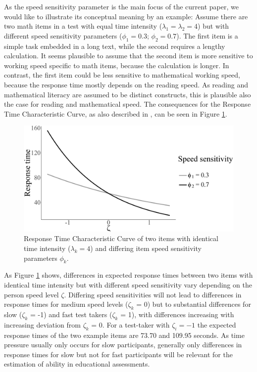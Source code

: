 \documentclass[a4paper,man,apacite,donotrepeattitle]{apa6}
\begin{document}
As the speed sensitivity parameter is the main focus of the current paper, we would like to illustrate its conceptual meaning by an example: Assume there are two math items in a test with equal time intensity ($\lambda_1 = \lambda_2 = 4$) but with different speed sensitivity parameters ($\phi_1 = 0.3$; $\phi_2 = 0.7$). The first item is a simple task embedded in a long text, while the second requires a lengthy calculation. It seems plausible to assume that the second item is more sensitive to working speed specific to math items, because the calculation is longer. In contrast, the first item could be less sensitive to mathematical working speed, because the response time mostly depends on the reading speed. As reading and mathematical literacy are assumed to be distinct constructs, this is plausible also the case for reading and mathematical speed. The consequences for the Response Time Characteristic Curve, as also described in , can be seen in Figure \ref{fig:phi_theoret}.

\begin{figure}
	\begin{center}
	 \includegraphics[height = 0.25\textheight]{phi_theoret.eps}
	\end{center}		
	 \caption{Response Time Characteristic Curve of two items with identical time intensity ($\lambda_{k} = 4$) and differing item speed sensitivity parameters $\phi_{k}$.}
	 \label{fig:phi_theoret}
\end{figure}

As Figure \ref{fig:phi_theoret} shows, differences in expected response times between two items with identical time intensity but with different speed sensitivity vary depending on the person speed level $\zeta$. Differing speed sensitivities will not lead to differences in response times for medium speed levels ($\zeta_{k}$ = 0) but to substantial differences for slow ($\zeta_{k}$ = -1) and fast test takers ($\zeta_{k}$ = 1), with differences increasing with increasing deviation from $\zeta_{k}$ = 0. For a test-taker with $\zeta_i = -1$ the expected response times of the two example items are 73.70 and 109.95 seconds. As time pressure usually only occurs for slow participants, generally only differences in response times for slow but not for fast participants will be relevant for the estimation of ability in educational assessments. 
\end{document}
